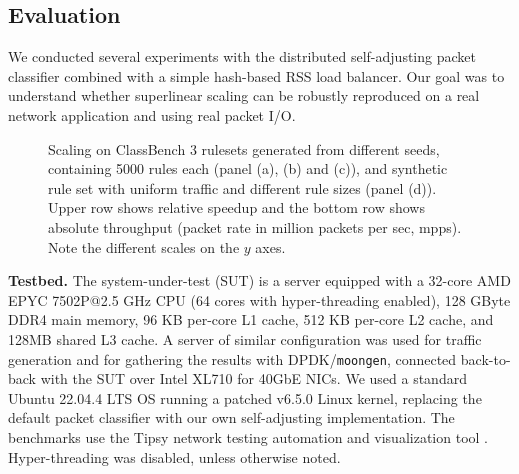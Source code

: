 \subsection{Evaluation}
\label{sec:sa-nf-tables-eval}

We conducted several experiments with the distributed self-adjusting packet classifier combined with a simple hash-based RSS load balancer. Our goal was to understand whether superlinear scaling can be robustly reproduced on a real network application and using real packet I/O. %

\begin{figure*}[t]
  \centering
  \subfloat[][acl1]{
    
    \label{fig:classbench-acl1}
  }
  \hspace{-1em}
  \subfloat[][ipc1]{
    
    \label{fig:classbench-ipc1}
  }
  \hspace{-1em}
  \subfloat[][fw1]{
    
    \label{fig:classbench-fw1}
  }
  \hspace{-1em}
  \caption{Scaling on ClassBench 3 rulesets generated from different seeds, containing 5000 rules each (panel (a), (b) and (c)), and synthetic rule set with uniform traffic and different rule sizes (panel (d)). Upper row shows relative speedup and the bottom row shows absolute throughput (packet rate in million packets per sec, mpps). Note the different scales on the $y$ axes.}
  \label{fig:classbench}
\end{figure*}

\noindent
\textbf{Testbed.} %
The system-under-test (SUT) is a server equipped with a 32-core AMD EPYC 7502P@2.5 GHz CPU (64 cores with hyper-threading enabled), 128 GByte DDR4 main memory, 96 KB per-core L1 cache, 512 KB per-core L2 cache, and 128MB shared L3 cache. A server of similar configuration was used for traffic generation and for gathering the results with DPDK\slash \texttt{moongen}, connected back-to-back with the SUT over Intel XL710 for 40GbE NICs. We used a standard Ubuntu 22.04.4 LTS OS running a patched v6.5.0 Linux kernel, replacing the default \nftables packet classifier with our own self-adjusting implementation. The benchmarks use the Tipsy network testing automation and visualization tool \cite{8468219}. Hyper-threading was disabled, unless otherwise noted.

